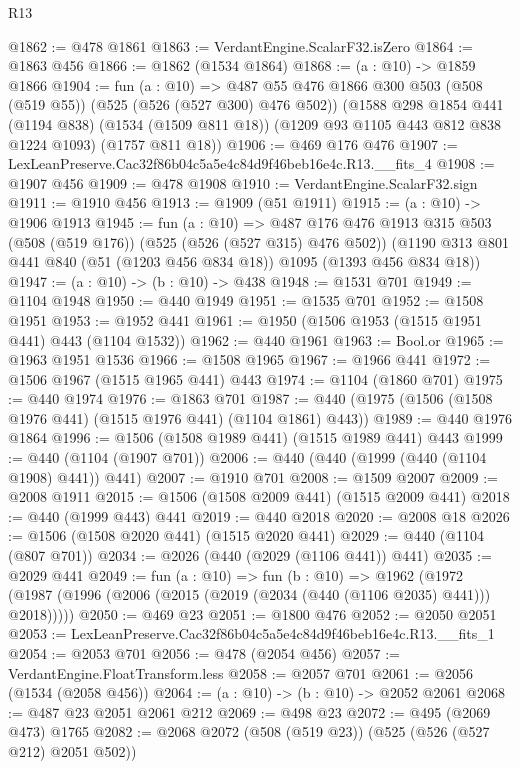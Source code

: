 \begin{lexlean}{R13}
\begin{coremodule}
@1862 := @478 @1861
@1863 := VerdantEngine.ScalarF32.isZero
@1864 := @1863 @456
@1866 := @1862 (@1534 @1864)
@1868 := (a : @10) -> @1859 @1866
@1904 := fun (a : @10) =>
  @487
    @55
    @476
    @1866
    @300
    @503
    (@508 (@519 @55))
    (@525 (@526 (@527 @300) @476 @502))
    (@1588
      @298
      @1854
      @441
      (@1194 @838)
      (@1534 (@1509 @811 @18))
      (@1209 @93 @1105 @443 @812 @838 @1224 @1093)
      (@1757 @811 @18))
@1906 := @469 @176 @476
@1907 := LexLeanPreserve.Cac32f86b04c5a5e4c84d9f46beb16e4c.R13.__fits_4
@1908 := @1907 @456
@1909 := @478 @1908
@1910 := VerdantEngine.ScalarF32.sign
@1911 := @1910 @456
@1913 := @1909 (@51 @1911)
@1915 := (a : @10) -> @1906 @1913
@1945 := fun (a : @10) =>
  @487
    @176
    @476
    @1913
    @315
    @503
    (@508 (@519 @176))
    (@525 (@526 (@527 @315) @476 @502))
    (@1190 @313 @801 @441 @840 (@51 (@1203 @456 @834 @18)) @1095 (@1393 @456 @834 @18))
@1947 := (a : @10) -> (b : @10) -> @438
@1948 := @1531 @701
@1949 := @1104 @1948
@1950 := @440 @1949
@1951 := @1535 @701
@1952 := @1508 @1951
@1953 := @1952 @441
@1961 := @1950 (@1506 @1953 (@1515 @1951 @441) @443 (@1104 @1532))
@1962 := @440 @1961
@1963 := Bool.or
@1965 := @1963 @1951 @1536
@1966 := @1508 @1965
@1967 := @1966 @441
@1972 := @1506 @1967 (@1515 @1965 @441) @443
@1974 := @1104 (@1860 @701)
@1975 := @440 @1974
@1976 := @1863 @701
@1987 := @440 (@1975 (@1506 (@1508 @1976 @441) (@1515 @1976 @441) (@1104 @1861) @443))
@1989 := @440 @1976 @1864
@1996 := @1506 (@1508 @1989 @441) (@1515 @1989 @441) @443
@1999 := @440 (@1104 (@1907 @701))
@2006 := @440 (@440 (@1999 (@440 (@1104 @1908) @441)) @441)
@2007 := @1910 @701
@2008 := @1509 @2007
@2009 := @2008 @1911
@2015 := @1506 (@1508 @2009 @441) (@1515 @2009 @441)
@2018 := @440 (@1999 @443) @441
@2019 := @440 @2018
@2020 := @2008 @18
@2026 := @1506 (@1508 @2020 @441) (@1515 @2020 @441)
@2029 := @440 (@1104 (@807 @701))
@2034 := @2026 (@440 (@2029 (@1106 @441)) @441)
@2035 := @2029 @441
@2049 := fun (a : @10) =>
  fun (b : @10) =>
  @1962 (@1972 (@1987 (@1996 (@2006 (@2015 (@2019 (@2034 (@440 (@1106 @2035) @441))) @2018)))))
@2050 := @469 @23
@2051 := @1800 @476
@2052 := @2050 @2051
@2053 := LexLeanPreserve.Cac32f86b04c5a5e4c84d9f46beb16e4c.R13.__fits_1
@2054 := @2053 @701
@2056 := @478 (@2054 @456)
@2057 := VerdantEngine.FloatTransform.less
@2058 := @2057 @701
@2061 := @2056 (@1534 (@2058 @456))
@2064 := (a : @10) -> (b : @10) -> @2052 @2061
@2068 := @487 @23 @2051 @2061 @212
@2069 := @498 @23
@2072 := @495 (@2069 @473) @1765
@2082 := @2068 @2072 (@508 (@519 @23)) (@525 (@526 (@527 @212) @2051 @502))

\end{coremodule}
\end{lexlean}
